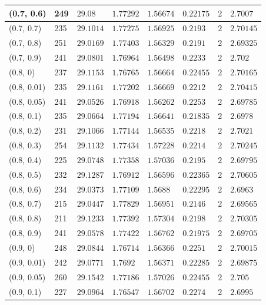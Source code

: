 \begin{center}
{\begin{longtable}{| l | p{} |  p{} | p{} | p{} | p{} | p{} | p{} |}
 (0.7, 0.6) & 249  & $29.08$ & $1.77292$ & $1.56674$ & $0.22175$ & $2$ & $2.7007$ \\ \hline
 (0.7, 0.7) & 235  & $29.1014$ & $1.77275$ & $1.56925$ & $0.2193$ & $2$ & $2.70145$ \\ \hline
 (0.7, 0.8) & 251  & $29.0169$ & $1.77403$ & $1.56329$ & $0.2191$ & $2$ & $2.69325$ \\ \hline
 (0.7, 0.9) & 241  & $29.0801$ & $1.76964$ & $1.56498$ & $0.2233$ & $2$ & $2.702$ \\ \hline
 (0.8, 0) & 237  & $29.1153$ & $1.76765$ & $1.56664$ & $0.22455$ & $2$ & $2.70165$ \\ \hline
 (0.8, 0.01) & 235  & $29.1161$ & $1.77202$ & $1.56669$ & $0.2212$ & $2$ & $2.70415$ \\ \hline
 (0.8, 0.05) & 241  & $29.0526$ & $1.76918$ & $1.56262$ & $0.2253$ & $2$ & $2.69785$ \\ \hline
 (0.8, 0.1) & 235  & $29.0664$ & $1.77194$ & $1.56641$ & $0.21835$ & $2$ & $2.6978$ \\ \hline
 (0.8, 0.2) & 231  & $29.1066$ & $1.77144$ & $1.56535$ & $0.2218$ & $2$ & $2.7021$ \\ \hline
 (0.8, 0.3) & 254  & $29.1132$ & $1.77434$ & $1.57228$ & $0.2214$ & $2$ & $2.70245$ \\ \hline
 (0.8, 0.4) & 225  & $29.0748$ & $1.77358$ & $1.57036$ & $0.2195$ & $2$ & $2.69795$ \\ \hline
 (0.8, 0.5) & 232  & $29.1287$ & $1.76912$ & $1.56596$ & $0.22365$ & $2$ & $2.70605$ \\ \hline
 (0.8, 0.6) & 234  & $29.0373$ & $1.77109$ & $1.5688$ & $0.22295$ & $2$ & $2.6963$ \\ \hline
 (0.8, 0.7) & 215  & $29.0447$ & $1.77829$ & $1.56951$ & $0.2146$ & $2$ & $2.69565$ \\ \hline
 (0.8, 0.8) & 211  & $29.1233$ & $1.77392$ & $1.57304$ & $0.2198$ & $2$ & $2.70305$ \\ \hline
 (0.8, 0.9) & 241  & $29.0578$ & $1.77422$ & $1.56762$ & $0.21975$ & $2$ & $2.69705$ \\ \hline
 (0.9, 0) & 248  & $29.0844$ & $1.76714$ & $1.56366$ & $0.2251$ & $2$ & $2.70015$ \\ \hline
 (0.9, 0.01) & 242  & $29.0771$ & $1.7692$ & $1.56371$ & $0.22285$ & $2$ & $2.69875$ \\ \hline
 (0.9, 0.05) & 260  & $29.1542$ & $1.77186$ & $1.57026$ & $0.22455$ & $2$ & $2.705$ \\ \hline
 (0.9, 0.1) & 227  & $29.0964$ & $1.76547$ & $1.56702$ & $0.2274$ & $2$ & $2.6995$ \\ \hline

\end{longtable}}
\end{center}
